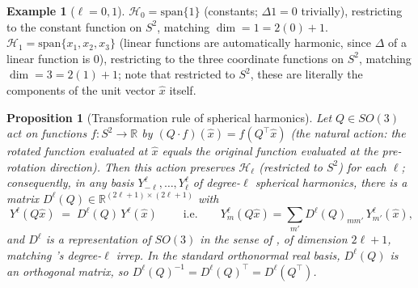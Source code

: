 \documentclass[11pt,a4paper]{report}
\newtheorem{proposition}[proposition]{Proposition}
\theoremstyle{definition}
\newtheorem{example}[example]{Example}
\theoremstyle{remark}
\newcommand{\RR}{\mathbb R}
\begin{document}
\begin{example}[$\ell=0,1$]
\label{ex:sph-low-degree}
$\mathcal H_0=\mathrm{span}\{1\}$ (constants; $\Delta1=0$ trivially),
restricting to the constant function on $S^2$, matching $\dim=1=2(0)+1$.
$\mathcal H_1=\mathrm{span}\{x_1,x_2,x_3\}$ (linear functions are
automatically harmonic, since $\Delta$ of a linear function is $0$),
restricting to the three coordinate functions on $S^2$, matching
$\dim=3=2(1)+1$; note that restricted to $S^2$, these are literally the
components of the unit vector $\hat x$ itself.
\end{example}

\begin{proposition}[Transformation rule of spherical harmonics]
\label{prop:sph-transform}
Let $Q\in SO(3)$ act on functions $f:S^2\to\RR$ by $(Q\cdot f)(\hat x) = f(Q^\top\hat x)$
(the natural action: the rotated function evaluated at $\hat x$ equals the
original function evaluated at the pre-rotation direction). Then this
action preserves $\mathcal H_\ell$ (restricted to $S^2$) for each $\ell$;
consequently, in any basis $Y^\ell_{-\ell},\dots,Y^\ell_\ell$ of degree-$\ell$
spherical harmonics, there is a matrix $D^\ell(Q)\in\RR^{(2\ell+1)\times(2\ell+1)}$
with
\begin{equation}
\label{eq:sph-equivariance-scratch}
\boxed{\;Y^\ell(Q\hat x) \;=\; D^\ell(Q)\,Y^\ell(\hat x)\;}
\qquad\text{i.e.}\qquad
Y^\ell_m(Q\hat x) = \sum_{m'} D^\ell(Q)_{mm'}\,Y^\ell_{m'}(\hat x),
\end{equation}
and $D^\ell$ is a representation of $SO(3)$ in the sense of
, of dimension $2\ell+1$, matching
's degree-$\ell$ irrep. In the standard
\emph{orthonormal} real basis, $D^\ell(Q)$ is an orthogonal matrix, so
$D^\ell(Q)^{-1}=D^\ell(Q)^\top=D^\ell(Q^\top)$.
\end{proposition}
\end{document}
